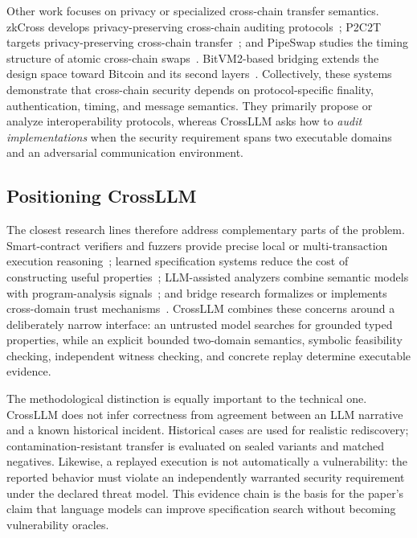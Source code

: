 \documentclass[journal]{IEEEtran}
\theoremstyle{definition}
\begin{document}
Other work focuses on privacy or specialized cross-chain transfer semantics. zkCross develops privacy-preserving cross-chain auditing protocols~\cite{guo2024zkcross}; P2C2T targets privacy-preserving cross-chain transfer~\cite{han2025p2c2t}; and PipeSwap studies the timing structure of atomic cross-chain swaps~\cite{ni2025pipeswap}. BitVM2-based bridging extends the design space toward Bitcoin and its second layers~\cite{woll2026bitvm2}. Collectively, these systems demonstrate that cross-chain security depends on protocol-specific finality, authentication, timing, and message semantics. They primarily propose or analyze interoperability protocols, whereas CrossLLM asks how to \emph{audit implementations} when the security requirement spans two executable domains and an adversarial communication environment.

\subsection{Positioning CrossLLM}

The closest research lines therefore address complementary parts of the problem. Smart-contract verifiers and fuzzers provide precise local or multi-transaction execution reasoning~\cite{permenev2020verx,frank2020ethbmc,choi2021smartian,shou2023ityfuzz}; learned specification systems reduce the cost of constructing useful properties~\cite{wang2024smartinv,liu2025propertygpt}; LLM-assisted analyzers combine semantic models with program-analysis signals~\cite{sun2024gptscan,ma2025iaudit}; and bridge research formalizes or implements cross-domain trust mechanisms~\cite{xie2022zkbridge,scaffino2023glimpse,scaffino2025alba}. CrossLLM combines these concerns around a deliberately narrow interface: an untrusted model searches for grounded typed properties, while an explicit bounded two-domain semantics, symbolic feasibility checking, independent witness checking, and concrete replay determine executable evidence.

The methodological distinction is equally important to the technical one. CrossLLM does not infer correctness from agreement between an LLM narrative and a known historical incident. Historical cases are used for realistic rediscovery; contamination-resistant transfer is evaluated on sealed variants and matched negatives. Likewise, a replayed execution is not automatically a vulnerability: the reported behavior must violate an independently warranted security requirement under the declared threat model. This evidence chain is the basis for the paper's claim that language models can improve specification search without becoming vulnerability oracles.
\end{document}
